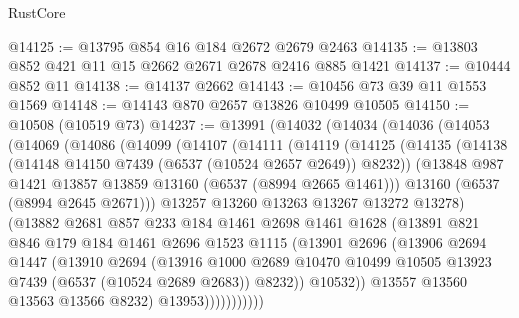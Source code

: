 \begin{lexlean}{RustCore}
\begin{coremodule}
@14125 := @13795 @854 @16 @184 @2672 @2679 @2463
@14135 := @13803 @852 @421 @11 @15 @2662 @2671 @2678 @2416 @885 @1421
@14137 := @10444 @852 @11
@14138 := @14137 @2662
@14143 := @10456 @73 @39 @11 @1553 @1569
@14148 := @14143 @870 @2657 @13826 @10499 @10505
@14150 := @10508 (@10519 @73)
@14237 := @13991
    (@14032
      (@14034
        (@14036
          (@14053
            (@14069
              (@14086
                (@14099
                  (@14107
                    (@14111
                      (@14119
                        (@14125
                          (@14135
                            (@14138 (@14148 @14150 @7439 (@6537 (@10524 @2657 @2649)) @8232))
                            (@13848 @987 @1421 @13857 @13859 @13160 (@6537 (@8994 @2665 @1461)))
                            @13160
                            (@6537 (@8994 @2645 @2671)))
                          @13257
                          @13260
                          @13263
                          @13267
                          @13272
                          @13278)
                        (@13882
                          @2681
                          @857
                          @233
                          @184
                          @1461
                          @2698
                          @1461
                          @1628
                          (@13891
                            @821
                            @846
                            @179
                            @184
                            @1461
                            @2696
                            @1523
                            @1115
                            (@13901
                              @2696
                              (@13906
                                @2694
                                @1447
                                (@13910
                                  @2694
                                  (@13916
                                    @1000
                                    @2689
                                    @10470
                                    @10499
                                    @10505
                                    @13923
                                    @7439
                                    (@6537 (@10524 @2689 @2683))
                                    @8232))
                                @10532))
                            @13557
                            @13560
                            @13563
                            @13566
                            @8232)
                          @13953)))))))))))

\end{coremodule}
\end{lexlean}
